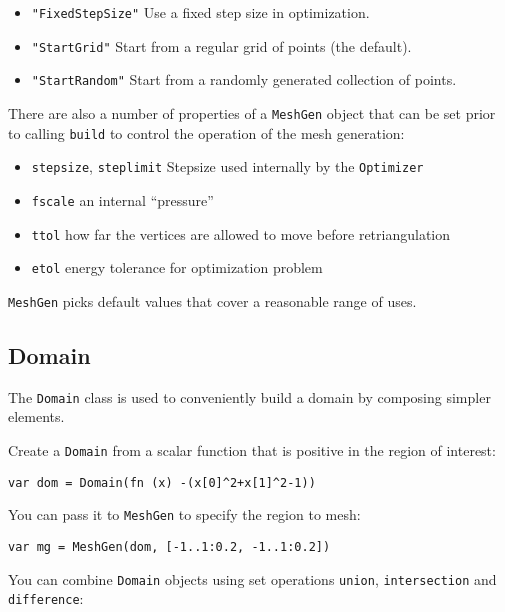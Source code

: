 \begin{itemize}

\item
  \texttt{"FixedStepSize"} Use a fixed step size in optimization.
\item
  \texttt{"StartGrid"} Start from a regular grid of points (the
  default).
\item
  \texttt{"StartRandom"} Start from a randomly generated collection of
  points.
\end{itemize}

There are also a number of properties of a \texttt{MeshGen} object that
can be set prior to calling \texttt{build} to control the operation of
the mesh generation:

\begin{itemize}

\item
  \texttt{stepsize}, \texttt{steplimit} Stepsize used internally by the
  \texttt{Optimizer}
\item
  \texttt{fscale} an internal ``pressure''
\item
  \texttt{ttol} how far the vertices are allowed to move before
  retriangulation
\item
  \texttt{etol} energy tolerance for optimization problem
\end{itemize}

\texttt{MeshGen} picks default values that cover a reasonable range of
uses.

\hypertarget{domain}{%
\subsection{Domain}\label{domain}}

The \texttt{Domain} class is used to conveniently build a domain by
composing simpler elements.

Create a \texttt{Domain} from a scalar function that is positive in the
region of interest:

\begin{lstlisting}
var dom = Domain(fn (x) -(x[0]^2+x[1]^2-1))
\end{lstlisting}

You can pass it to \texttt{MeshGen} to specify the region to mesh:

\begin{lstlisting}
var mg = MeshGen(dom, [-1..1:0.2, -1..1:0.2])
\end{lstlisting}

You can combine \texttt{Domain} objects using set operations
\texttt{union}, \texttt{intersection} and \texttt{difference}:

